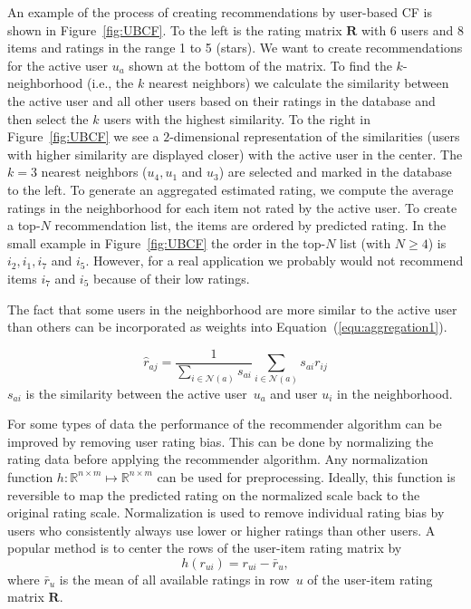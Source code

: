 \documentclass[nojss]{jss}
\newcommand{\set}[1]{\mathcal{#1}}
\newcommand{\mat}[1]{{\mathbf{#1}}}
\begin{document}
An example of the process of creating recommendations by 
user-based CF is shown in Figure~\ref{fig:UBCF}. To the left is the rating
matrix $\mat{R}$ with 6 users and 8 items and ratings in the
range 1 to 5 (stars). 
We want to create recommendations for the active user $u_a$ 
shown at the bottom of the matrix.  To find the
$k$-neighborhood (i.e., the $k$ nearest neighbors) we calculate the similarity
between the active user and all other users 
based on their ratings
in the database and then select the
$k$ users with the highest similarity. To the right in Figure~\ref{fig:UBCF}
we see a $2$-dimensional representation of the similarities (users with higher
similarity are displayed closer) with the active user in the center. 
The $k=3$ nearest
neighbors ($u_4, u_1$ and $u_3$) are selected and marked in the 
database to the left. To generate an
aggregated estimated rating, we 
compute the average ratings in the neighborhood for each item not
rated by the active user.
To create a top-$N$ recommendation list, the items are ordered by
predicted rating. 
In the small example in 
Figure~\ref{fig:UBCF} the order in the top-$N$ list (with $N \ge 4$) 
is $i_2, i_1, i_7$ and $i_5$. However, for a real application we 
probably would
not recommend items $i_7$ and $i_5$ because of their low ratings.

The fact that some users in the neighborhood are more similar to
the active user than others can be 
incorporated as weights into
Equation~(\ref{equ:aggregation1}). 

\begin{equation}
\hat{r}_{aj}=\frac{1}{\sum_{i\in\set{N}(a)} s_{ai}} \sum_{i\in\set{N}(a)} s_{ai} r_{ij}
\label{equ:aggregation2}
\end{equation}
$s_{ai}$ is the similarity between the active user~$u_a$ and user
$u_i$ in the neighborhood. 

For some types of data the performance of the recommender algorithm can 
be improved by removing user rating bias.
This can be done by normalizing the rating data before applying the 
recommender algorithm.
Any normalization 
function $h: \mathbb{R}^{n \times m} \mapsto \mathbb{R}^{n \times m}$ 
can be used for preprocessing. Ideally, this function is reversible
to map the predicted rating on the normalized scale back
to the original rating scale. 
Normalization is used to remove individual rating bias by 
users who consistently always use lower or higher
ratings than other users. 
A popular method is to center the rows of the user-item rating matrix 
by
$$h(r_{ui}) = r_{ui} - \bar{r}_u,$$
where $\bar{r}_u$ is the mean of all available ratings in row~$u$ of 
the user-item rating matrix $\mat{R}$.
\end{document}
